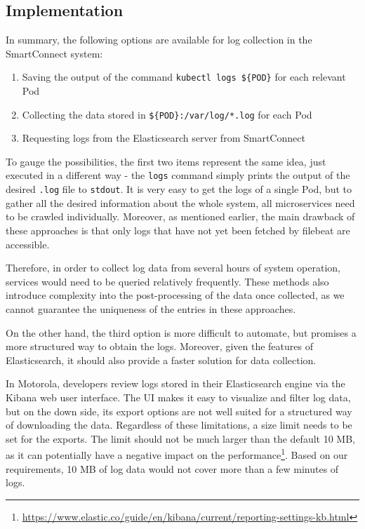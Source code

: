 \subsection{Implementation}

In summary, the following options are available for log collection in the SmartConnect system:
\begin{enumerate}
\item Saving the output of the command \texttt{kubectl logs \$\{POD\}} for each relevant Pod 
\item Collecting the data stored in \texttt{\$\{POD\}:/var/log/*.log} for each Pod \item Requesting logs from the Elasticsearch server from SmartConnect
\end{enumerate}


To gauge the possibilities, the first two items represent the same idea, just executed in a different way - the \texttt{logs} command simply prints the output of the desired \texttt{.log} file to \texttt{stdout}. 
It is very easy to get the logs of a single Pod, but to gather all the desired information about the whole system, all microservices need to be crawled individually. Moreover, as mentioned earlier, the main drawback of these approaches is that only logs that have not yet been fetched by filebeat are accessible.

Therefore, in order to collect log data from several hours of system operation, services would need to be queried relatively frequently. These methods also introduce complexity into the post-processing of the data once collected, as we cannot guarantee the uniqueness of the entries in these approaches.

On the other hand, the third option is more difficult to automate, but promises a more structured way to obtain the logs. Moreover, given the features of Elasticsearch, it should also provide a faster solution for data collection.

In Motorola, developers review logs stored in their Elasticsearch engine via the Kibana web user interface. The UI makes it easy to visualize and filter log data, but on the down side, its export options are not well suited for a structured way of downloading the data. Regardless of these limitations, a size limit needs to be set for the exports. The limit should not be much larger than the default 10 MB, as it can potentially have a negative impact on the performance\footnote{\url{https://www.elastic.co/guide/en/kibana/current/reporting-settings-kb.html}}. Based on our requirements, 10 MB of log data would not cover more than a few minutes of logs.

